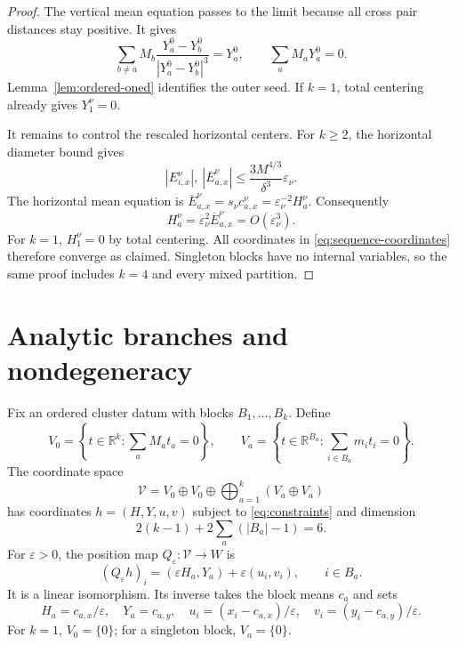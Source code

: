 \documentclass[11pt,a4paper]{amsart}
\numberwithin{equation}{section}
\newcommand{\R}{\mathbb R}
\newcommand{\eps}{\varepsilon}
\newcommand{\cV}{\mathcal V}
\begin{document}
\begin{proof}
The vertical mean equation passes to the limit because all cross
pair distances stay positive. It gives
\[
 \sum_{b\ne a}M_b\frac{Y_a^0-Y_b^0}{|Y_a^0-Y_b^0|^3}=Y_a^0,
 \qquad \sum_aM_aY_a^0=0.
\]
Lemma~\ref{lem:ordered-oned} identifies the outer seed. If $k=1$,
total centering already gives $Y_1^\nu=0$.

It remains to control the rescaled horizontal centers. For $k\ge2$,
the horizontal diameter bound gives
\[
 |E_{i,x}^\nu|,\ |\overline E_{a,x}^\nu|
          \le\frac{3M^{4/3}}{\delta^3}\eps_\nu.
\]
The horizontal mean equation is
$\overline E_{a,x}^\nu=s_\nu c_{a,x}^\nu=\eps_\nu^{-2}H_a^\nu$.
Consequently
\begin{equation}\label{eq:horizontal-center}
 H_a^\nu=\eps_\nu^2\overline E_{a,x}^\nu=O(\eps_\nu^3).
\end{equation}
For $k=1$, $H_1^\nu=0$ by total centering. All coordinates in
\eqref{eq:sequence-coordinates} therefore converge as claimed.
Singleton blocks have no internal variables, so the same proof includes
$k=4$ and every mixed partition.
\end{proof}

\section{Analytic branches and nondegeneracy}\label{sec:local}

Fix an ordered cluster datum with blocks $B_1,\ldots,B_k$. Define
\[
 V_0=\left\{t\in\R^k:\sum_aM_at_a=0\right\},\qquad
 V_a=\left\{t\in\R^{B_a}:\sum_{i\in B_a}m_it_i=0\right\}.
\]
The coordinate space
\begin{equation}\label{eq:blowup-space}
 \cV=V_0\oplus V_0\oplus\bigoplus_{a=1}^k(V_a\oplus V_a)
\end{equation}
has coordinates $h=(H,Y,u,v)$ subject to \eqref{eq:constraints} and
dimension
\[
 2(k-1)+2\sum_a(|B_a|-1)=6.
\]
For $\eps>0$, the position map $Q_\eps:\cV\to W$ is
\begin{equation}\label{eq:coordinates}
 (Q_\eps h)_i=(\eps H_a,Y_a)+\eps(u_i,v_i),\qquad i\in B_a.
\end{equation}
It is a linear isomorphism. Its inverse takes the block means $c_a$
and sets
\[
 H_a=c_{a,x}/\eps,\quad Y_a=c_{a,y},\quad
 u_i=(x_i-c_{a,x})/\eps,\quad v_i=(y_i-c_{a,y})/\eps.
\]
For $k=1$, $V_0=\{0\}$; for a singleton block, $V_a=\{0\}$.
\end{document}
